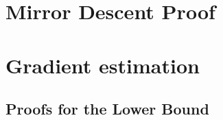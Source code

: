 
\section{Mirror Descent Proof}
\label{sec:appendix-md}


\section{Gradient estimation}
\label{sec:appendix-grad}


\subsection{Proofs for the Lower Bound}
\label{sec:lb-proof}



